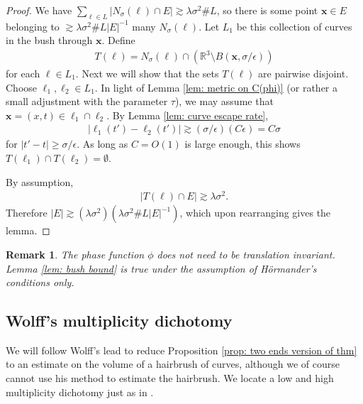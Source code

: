 \documentclass[12pt]{amsart}
\newcommand{\x}{{\bf{x}}}
\numberwithin{equation}{section}
\newtheorem{remark}[lemma]{Remark}
\newcommand{\R}{\mathbb{R}}
\newcommand{\1}{\mathbbm{1}}
\renewcommand{\x}{\mathbf x}
\begin{document}
\begin{proof}
    We have $\sum_{\ell \in L} |N_\sigma(\ell) \cap E| \gtrsim \lambda \sigma^2 \# L$, so there is some point $\x \in E$ belonging to $\gtrsim \lambda \sigma^2 \# L |E|^{-1}$ many $N_\sigma(\ell)$. Let $L_1$ be this collection of curves in the bush through $\x$. Define 
    \begin{align}
        T(\ell) = N_\sigma(\ell) \cap (\R^3 \setminus B(\x, \sigma / \epsilon))
    \end{align}
    for each $\ell \in L_1$. Next we will show that the sets $T(\ell)$ are pairwise disjoint. Choose $\ell_1, \ell_2 \in L_1$. In light of Lemma \ref{lem: metric on C(phi)} (or rather a small adjustment with the parameter $\tau$), we may assume that $\x = (x, t) \in \ell_1 \cap \ell_2$. By Lemma \ref{lem: curve escape rate}, 
    \begin{align}
        |\ell_1(t') - \ell_2(t')| \gtrsim (\sigma / \epsilon)(C \epsilon) = C \sigma
    \end{align}
    for $|t' - t| \geq \sigma / \epsilon$. As long as $C = O(1)$ is large enough, this shows $T(\ell_1) \cap T(\ell_2) = \emptyset$.

    By assumption, 
    \begin{align}
        |T(\ell) \cap E| \gtrsim \lambda \sigma^2. 
    \end{align}
    Therefore $|E| \gtrsim (\lambda \sigma^2) (\lambda \sigma^2 \# L|E|^{-1})$, which upon rearranging gives the lemma.
\end{proof}

\begin{remark}
    The phase function $\phi$ does not need to be translation invariant. Lemma \ref{lem: bush bound} is true under the assumption of H\"ormander's conditions only. 
\end{remark}

\subsection{Wolff's multiplicity dichotomy}

We will follow Wolff's lead to reduce Proposition \ref{prop: two ends version of thm} to an estimate on the volume of a hairbrush of curves, although we of course cannot use his method to estimate the hairbrush. We locate a low and high multiplicity dichotomy just as in \cite{wolffHairbrush}. 
\end{document}
